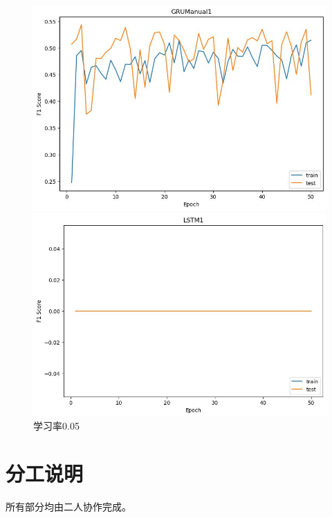 \documentclass[UTF8]{article}
\begin{document}
\begin{figure}[h]
    \begin{minipage}{.43\linewidth}
        \centering
        \includegraphics[width=\linewidth]{../figure/GRUManual1_F1.jpg}
    \end{minipage}
    \begin{minipage}{.43\linewidth}
        \centering
        \includegraphics[width=\linewidth]{../figure/LSTM1_F1.jpg}
    \end{minipage}
    \caption{学习率0.05}
    \label{fig:param}
\end{figure}


\section{分工说明}
所有部分均由二人协作完成。
\end{document}
